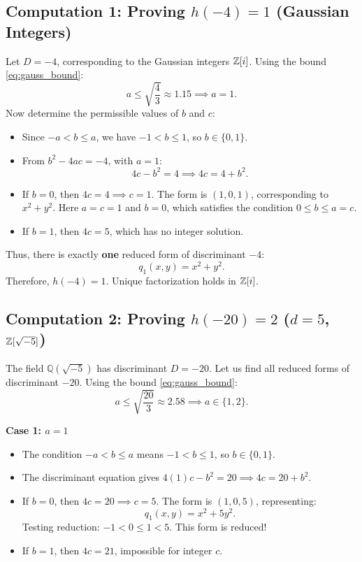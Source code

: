 \documentclass[a4paper]{article}
\begin{document}
\subsection{Computation 1: Proving \texorpdfstring{$h(-4) = 1$}{h(-4) = 1} (Gaussian Integers)}
\label{subsec:comp_h4}
Let $D = -4$, corresponding to the Gaussian integers $\mathbb{Z}[i]$.
Using the bound \eqref{eq:gauss_bound}:
\begin{equation}
 a \le \sqrt{\frac{4}{3}} \approx 1.15 \implies a = 1.
\end{equation}
Now determine the permissible values of $b$ and $c$:
\begin{itemize}
 \item Since $-a < b \le a$, we have $-1 < b \le 1$, so $b \in \{0, 1\}$.
 \item From $b^2 - 4ac = -4$, with $a = 1$:
 \begin{equation}
  4c - b^2 = 4 \implies 4c = 4 + b^2.
 \end{equation}
 \item If $b = 0$, then $4c = 4 \implies c = 1$. The form is $(1, 0, 1)$, corresponding to $x^2 + y^2$. Here $a = c = 1$ and $b = 0$, which satisfies the condition $0 \le b \le a = c$.
 \item If $b = 1$, then $4c = 5$, which has no integer solution.
\end{itemize}
Thus, there is exactly \textbf{one} reduced form of discriminant $-4$:
\begin{equation}
 \boxed{q_1(x, y) = x^2 + y^2}.
\end{equation}
Therefore, $h(-4) = 1$. Unique factorization holds in $\mathbb{Z}[i]$.

\subsection{Computation 2: Proving \texorpdfstring{$h(-20) = 2$}{h(-20) = 2} (\texorpdfstring{$d = 5$, $\mathbb{Z}[\sqrt{-5}]$}{d = 5, Z[sqrt(-5)]})}
\label{subsec:comp_h20}
The field $\mathbb{Q}(\sqrt{-5})$ has discriminant $D = -20$. Let us find all reduced forms of discriminant $-20$.
Using the bound \eqref{eq:gauss_bound}:
\begin{equation}
 a \le \sqrt{\frac{20}{3}} \approx 2.58 \implies a \in \{1, 2\}.
\end{equation}

\noindent\textbf{Case 1: $a = 1$}
\begin{itemize}
 \item The condition $-a < b \le a$ means $-1 < b \le 1$, so $b \in \{0, 1\}$.
 \item The discriminant equation gives $4(1)c - b^2 = 20 \implies 4c = 20 + b^2$.
 \item If $b = 0$, then $4c = 20 \implies c = 5$. The form is $(1, 0, 5)$, representing:
 \begin{equation}
  q_1(x, y) = x^2 + 5y^2.
 \end{equation}
 Testing reduction: $-1 < 0 \le 1 < 5$. This form is reduced!
 \item If $b = 1$, then $4c = 21$, impossible for integer $c$.
\end{itemize}
\end{document}
